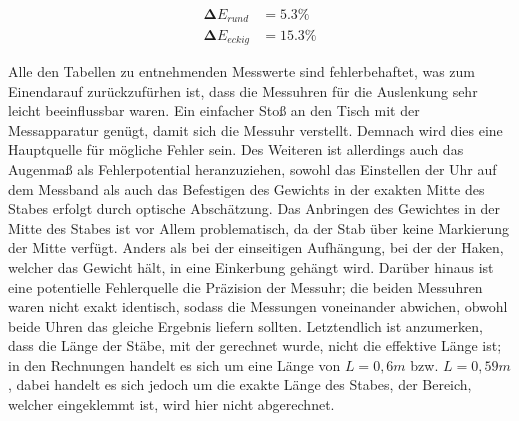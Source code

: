 \begin{align}
    \symbf{\Delta}E_{rund} &= 5.3 \% \\
    \symbf{\Delta}E_{eckig} &= 15.3 \%
\end{align}


\noindent Alle den Tabellen zu entnehmenden Messwerte sind fehlerbehaftet, was 
zum Einendarauf zurückzufürhen ist, dass die Messuhren für die Auslenkung sehr 
leicht beeinflussbar waren. Ein einfacher Stoß an den Tisch mit der Messapparatur 
genügt, damit sich die Messuhr verstellt. Demnach wird dies eine Hauptquelle
für mögliche Fehler sein. Des Weiteren ist allerdings auch das Augenmaß als 
Fehlerpotential heranzuziehen, sowohl das Einstellen der Uhr auf dem Messband
als auch das Befestigen des Gewichts in der exakten Mitte des Stabes erfolgt
durch optische Abschätzung. Das Anbringen des Gewichtes in der Mitte des 
Stabes ist vor Allem problematisch, da der Stab über keine Markierung der Mitte
verfügt. Anders als bei der einseitigen Aufhängung, bei der der Haken, welcher 
das Gewicht hält, in eine Einkerbung gehängt wird. Darüber hinaus ist eine 
potentielle Fehlerquelle die Präzision der Messuhr; die beiden Messuhren waren
nicht exakt identisch, sodass die Messungen voneinander abwichen, obwohl beide 
Uhren das gleiche Ergebnis liefern sollten. Letztendlich ist anzumerken, dass 
die Länge der Stäbe, mit der gerechnet wurde, nicht die effektive Länge ist;
in den Rechnungen handelt es sich um eine Länge von $L = 0,6m$ bzw. $L = 0,59m$,
dabei handelt es sich jedoch um die exakte Länge des Stabes, der Bereich, welcher
eingeklemmt ist, wird hier nicht abgerechnet.